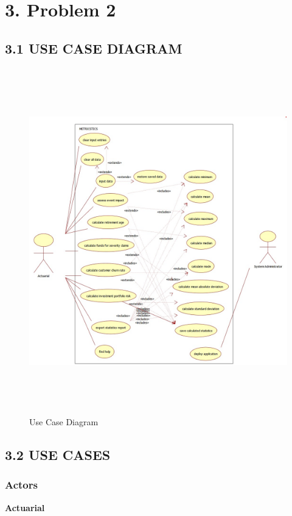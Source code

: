 \section{3. Problem 2}
\vspace{10pt}

\subsection{3.1 USE CASE DIAGRAM}
\vspace{10pt}
\begin{figure}[H]
	\centering
	\includegraphics[width=\linewidth,height=15cm]{d1/UseCase Team R.jpeg}
	\caption{Use Case Diagram} 
	\label{CRC}
\end{figure}
\vspace{100pt}
\subsection{3.2 USE CASES}
\subsubsection{Actors}
\hspace{0.5cm}\textbf {Actuarial}\\

